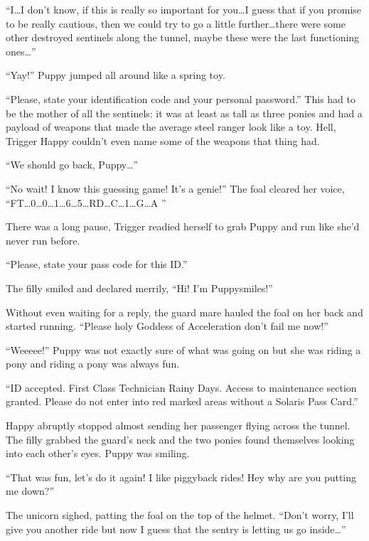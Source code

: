 ``I\dots I don't know, if this is really so important for you\dots I guess that if you promise to be really cautious, then we could try to go a little further\dots there were some other destroyed sentinels along the tunnel, maybe these were the last functioning ones\dots''

``Yay!'' Puppy jumped all around like a spring toy.

\horizonline


``{\mt Please, state your identification code and your personal password.}'' This had to be the mother of all the sentinels: it was at least as tall as three ponies and had a payload of weapons that made the average steel ranger look like a toy. Hell, Trigger Happy couldn't even name some of the weapons that thing had.

``We should go back, Puppy\dots''

``No wait! I know this guessing game! It's a genie!'' The foal cleared her voice, ``FT\dots 0\dots 0\dots 1\dots 6\dots 5\dots RD\dots C\dots 1\dots G\dots A ''

There was a long pause, Trigger readied herself to grab Puppy and run like she'd never run before.

``{\mt Please, state your pass code for this ID.}''

The filly smiled and declared merrily, ``Hi! I'm Puppysmiles!''

Without even waiting for a reply, the guard mare hauled the foal on her back and started running. ``Please holy Goddess of Acceleration don't fail me now!''

``Weeeee!'' Puppy was not exactly sure of what was going on but she was riding a pony and riding a pony was always fun.

``{\mt ID accepted. First Class Technician Rainy Days. Access to maintenance section granted. Please do not enter into red marked areas without a Solaris Pass Card.}''

Happy abruptly stopped almost sending her passenger flying across the tunnel. The filly grabbed the guard's neck and the two ponies found themselves looking into each other's eyes. Puppy was smiling.

``That was fun, let's do it again! I like piggyback rides! Hey why are you putting me down?''

The unicorn sighed, patting the foal on the top of the helmet. ``Don't worry, I'll give you another ride but now I guess that the sentry is letting us go inside\dots''


